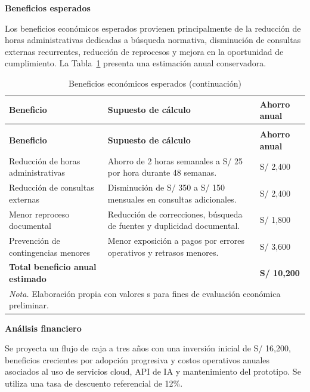 \documentclass[12pt,a4paper,oneside]{report}
\begin{document}
\textbf{Beneficios esperados}

Los beneficios económicos esperados provienen principalmente de la reducción de horas administrativas dedicadas a búsqueda normativa, disminución de consultas externas recurrentes, reducción de reprocesos y mejora en la oportunidad de cumplimiento. La Tabla~\ref{tab:beneficios-esperados} presenta una estimación anual conservadora.

\begin{longtable}{@{}p{}p{}p{}@{}}
\caption{Beneficios económicos esperados}\label{tab:beneficios-esperados}\\
\toprule
\textbf{Beneficio} & \textbf{Supuesto de cálculo} & \textbf{Ahorro anual} \\
\midrule
\endfirsthead
\caption[]{Beneficios económicos esperados (continuación)}\\
\toprule
\textbf{Beneficio} & \textbf{Supuesto de cálculo} & \textbf{Ahorro anual} \\
\midrule
\endhead
Reducción de horas administrativas & Ahorro de 2 horas semanales a S/ 25 por hora durante 48 semanas. & S/ 2,400 \\
Reducción de consultas externas & Disminución de S/ 350 a S/ 150 mensuales en consultas adicionales. & S/ 2,400 \\
Menor reproceso documental & Reducción de correcciones, búsqueda de fuentes y duplicidad documental. & S/ 1,800 \\
Prevención de contingencias menores & Menor exposición a pagos por errores operativos y retrasos menores. & S/ 3,600 \\
\textbf{Total beneficio anual estimado} & & \textbf{S/ 10,200} \\
\bottomrule
\multicolumn{3}{p{0.94\textwidth}}{\normalsize \textit{Nota.} Elaboración propia con valores s para fines de evaluación económica preliminar.}\\
\end{longtable}

\textbf{Análisis financiero}

Se proyecta un flujo de caja a tres años con una inversión inicial de S/ 16,200, beneficios crecientes por adopción progresiva y costos operativos anuales asociados al uso de servicios cloud, API de IA y mantenimiento del prototipo. Se utiliza una tasa de descuento referencial de 12\%.
\end{document}
